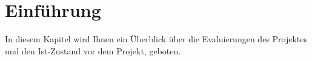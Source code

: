 \section{Einführung}
\label{sec:intro}
In diesem Kapitel wird Ihnen ein Überblick über die Evaluierungen des Projektes und den Ist-Zustand vor dem Projekt, geboten.





